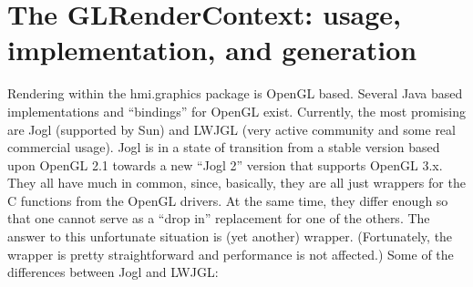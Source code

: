 \section{The GLRenderContext: usage, implementation, and generation}
Rendering within the hmi.graphics package is OpenGL based. Several Java based implementations
and ``bindings'' for OpenGL exist. Currently, the most promising are Jogl (supported by Sun)
and LWJGL (very active community and some real commercial usage). Jogl is in a state of transition from a stable version based upon OpenGL 2.1 towards a new ``Jogl 2'' version that supports OpenGL 3.x. 
They all have much in common, since, basically, they are all just wrappers for the C functions from the OpenGL drivers.
At the same time, they differ enough so that one cannot serve as a ``drop in'' replacement for one of the others.
The answer to this unfortunate situation is (yet another) wrapper. (Fortunately, the wrapper is pretty straightforward and performance is not affected.)
Some of the differences between Jogl and LWJGL:
